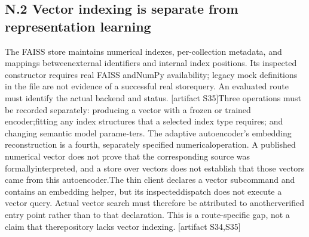 \subsection*{N.2  Vector indexing is separate from representation learning}
\noindent
The FAISS store maintains numerical indexes, per-collection metadata, and mappings between\linebreak[4]
external identifiers and internal index positions. Its inspected constructor requires real FAISS and\linebreak[4]
NumPy availability; legacy mock definitions in the file are not evidence of a successful real store\linebreak[4]
query. An evaluated route must identify the actual backend and status. [artifact S35]\linebreak[4]
Three operations must be recorded separately: producing a vector with a frozen or trained encoder;\linebreak[4]
fitting any index structures that a selected index type requires; and changing semantic model parame-\linebreak[4]
ters. The adaptive autoencoder's embedding reconstruction is a fourth, separately specified numerical\linebreak[4]
operation. A published numerical vector does not prove that the corresponding source was formally\linebreak[4]
interpreted, and a store over vectors does not establish that those vectors came from this autoencoder.\linebreak[4]
The thin client declares a vector subcommand and contains an embedding helper, but its inspected\linebreak[4]
dispatch does not execute a vector query. Actual vector search must therefore be attributed to another\linebreak[4]
verified entry point rather than to that declaration. This is a route-specific gap, not a claim that the\linebreak[4]
repository lacks vector indexing. [artifact S34,S35]\par

